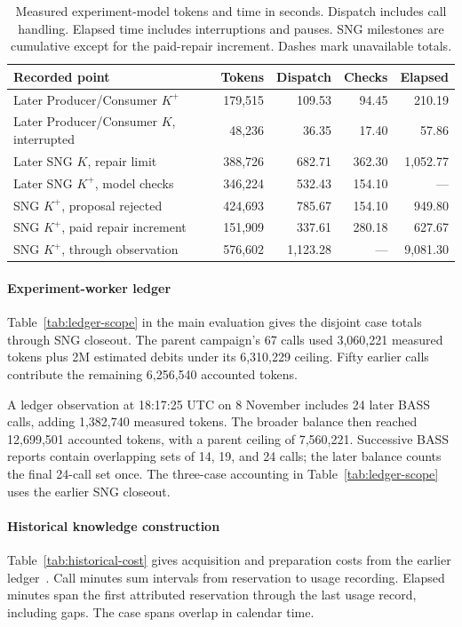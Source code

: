 \begin{table}[!htbp]
\caption{Measured experiment-model tokens and time in seconds. Dispatch includes call handling. Elapsed time includes interruptions and pauses. SNG milestones are cumulative except for the paid-repair increment. Dashes mark unavailable totals.}
\label{tab:recorded-timing}
\centering\small
\begin{tabular}{@{}p{.40\linewidth}rrrr@{}}
\hline
Recorded point & Tokens & Dispatch & Checks & Elapsed \\
\hline
Later Producer/Consumer $K^{+}$ & 179,515 & 109.53 & 94.45 & 210.19 \\
Later Producer/Consumer $K$, interrupted & 48,236 & 36.35 & 17.40 & 57.86 \\
Later SNG $K$, repair limit & 388,726 & 682.71 & 362.30 & 1,052.77 \\
Later SNG $K^{+}$, model checks & 346,224 & 532.43 & 154.10 & --- \\
SNG $K^{+}$, proposal rejected & 424,693 & 785.67 & 154.10 & 949.80 \\
SNG $K^{+}$, paid repair increment & 151,909 & 337.61 & 280.18 & 627.67 \\
SNG $K^{+}$, through observation & 576,602 & 1,123.28 & --- & 9,081.30 \\
\hline
\end{tabular}
\end{table}

\paragraph{Experiment-worker ledger}
Table~\ref{tab:ledger-scope} in the main evaluation gives the disjoint case totals through SNG closeout. The parent campaign's 67 calls used 3,060,221 measured tokens plus 2M estimated debits under its 6,310,229 ceiling. Fifty earlier calls contribute the remaining 6,256,540 accounted tokens.

A ledger observation at 18:17:25 UTC on 8 November includes 24 later BASS calls, adding 1,382,740 measured tokens. The broader balance then reached 12,699,501 accounted tokens, with a parent ceiling of 7,560,221. Successive BASS reports contain overlapping sets of 14, 19, and 24 calls; the later balance counts the final 24-call set once. The three-case accounting in Table~\ref{tab:ledger-scope} uses the earlier SNG closeout.

\paragraph{Historical knowledge construction}
Table~\ref{tab:historical-cost} gives acquisition and preparation costs from the earlier ledger~\cite{isoletteConsolidatedReport2026,producerConsumerConsolidatedReport2026}. Call minutes sum intervals from reservation to usage recording. Elapsed minutes span the first attributed reservation through the last usage record, including gaps. The case spans overlap in calendar time.

